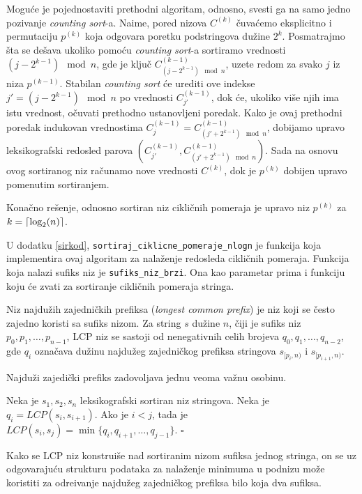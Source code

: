 Mogu\' ce je pojednostaviti prethodni algoritam, odnosno, svesti ga na samo jedno pozivanje \textit{counting sort}-a. Naime, pored nizova $C^{(k)}$ \v cuva\' cemo eksplicitno i permutaciju $p^{(k)}$ koja odgovara poretku podstringova du\v zine $2^k$. Posmatrajmo \v sta se de\v sava ukoliko pomo\' cu \textit{counting sort}-a sortiramo vrednosti $(j - 2^{k-1}) \mod n$, gde je klju\v c $C^{(k-1)}_{(j - 2^{k-1}) \mod n}$, uzete redom za svako $j$ iz niza $p^{(k-1)}$. Stabilan \textit{counting sort} \' ce urediti ove indekse $j' = (j - 2^{k-1}) \mod n$ po vrednosti $C^{(k-1)}_{j'}$, dok \' ce, ukoliko vi\v se njih ima istu vrednost, o\v cuvati prethodno ustanovljeni poredak. Kako je ovaj prethodni poredak indukovan vrednostima $C^{(k-1)}_j = C^{(k-1)}_{(j' + 2^{k-1}) \mod n}$, dobijamo upravo leksikografski redosled parova $(C^{(k-1)}_{j'}, C^{(k-1)}_{(j' + 2^{k-1}) \mod n})$. Sada na osnovu ovog sortiranog niz ra\v cunamo nove vrednosti $C^{(k)}$, dok je $p^{(k)}$ dobijen upravo pomenutim sortiranjem.

Kona\v cno re\v senje, odnosno sortiran niz cikli\v cnih pomeraja je upravo niz $p^{(k)}$ za $k = \left \lceil \log_2(n) \right \rceil$.

U dodatku \ref{sirkod}, \texttt{sortiraj\_ciklicne\_pomeraje\_nlogn} je funkcija koja implementira ovaj algoritam za nala\v zenje redosleda cikli\v cnih pomeraja. Funkcija koja nalazi sufiks niz je \texttt{sufiks\_niz\_brzi}. Ona kao parametar prima i funkciju koju \' ce zvati za sortiranje cikli\v cnih pomeraja stringa.


Niz najdu\v zih zajedni\v ckih prefiksa (\textit{longest common prefix}) je niz koji se \v cesto zajedno koristi sa sufiks nizom. Za string $s$ du\v zine $n$, \v ciji je sufiks niz $p_0, p_1, \ldots, p_{n-1}$, LCP niz se sastoji od nenegativnih celih brojeva $q_0, q_1, \ldots, q_{n-2}$, gde $q_i$ ozna\v cava du\v zinu najdu\v zeg zajedni\v ckog prefiksa stringova $s_{[p_i, n)}$ i $s_{[p_{i+1}, n)}$.

Najdu\v zi zajedi\v cki prefiks zadovoljava jednu veoma va\v znu osobinu.

\begin{thm}
\label{lcposobina}
Neka je $s_1, s_2, s_n$ leksikografski sortiran niz stringova. Neka je $q_i = LCP(s_i, s_{i+1})$. Ako je $i<j$, tada je $LCP(s_i, s_j) = \min\{q_i, q_{i+1}, \ldots, q_{j-1}\}$. \hfill $\square$
\end{thm}

Kako se LCP niz konstrui\v se nad sortiranim nizom sufiksa jednog stringa, on se uz odgovaraju\' cu strukturu podataka za nala\v zenje minimuma u podnizu mo\v ze koristiti za odre\dj ivanje najdu\v zeg zajedni\v ckog prefiksa bilo koja dva sufiksa.

